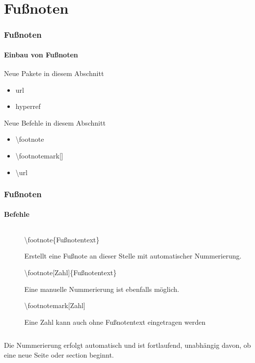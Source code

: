\section{Fu\ss noten}

\begin{frame}
\frametitle{Fu\ss noten}
\framesubtitle{Einbau von Fu\ss noten}
\begin{exampleblock}{Neue Pakete in diesem Abschnitt}
\begin{itemize}
\item url
\item hyperref
\end{itemize}
\end{exampleblock}
\begin{block}{Neue Befehle in diesem Abschnitt}
\begin{itemize}
\item \color{nounibaredI}\textbackslash footnote
\item \textbackslash footnotemark\color{nounibagreenI}[]\color{nounibaredI}
\item \textbackslash url\color{black}
\end{itemize}
\end{block}
\end{frame}


\begin{frame}
\frametitle{Fu\ss noten}
\framesubtitle{Befehle}
\begin{columns}
\begin{column}{0.5\textwidth}
\begin{ttfamily}\scriptsize

\end{ttfamily}
\end{column}
\begin{column}{0.5\textwidth}
\begin{ttfamily}\color{nounibaredI}\textbackslash footnote\color{black}\{Fu\ss notentext\}\end{ttfamily} Erstellt eine Fußnote an dieser Stelle mit automatischer Nummerierung.

\begin{ttfamily}\color{nounibaredI}\textbackslash footnote\color{nounibagreenI}[Zahl]\color{black}\{Fu\ss notentext\}\end{ttfamily} Eine manuelle Nummerierung ist ebenfalls möglich.

\begin{ttfamily}\color{nounibaredI}\textbackslash footnotemark\color{nounibagreenI}[Zahl]\color{black}\end{ttfamily}
Eine Zahl kann auch ohne Fußnotentext eingetragen werden
\end{column}
\end{columns}
\bigskip
Die Nummerierung erfolgt automatisch und ist fortlaufend, unabhängig davon, ob
eine neue Seite oder {\ttfamily section} beginnt.
\end{frame}

